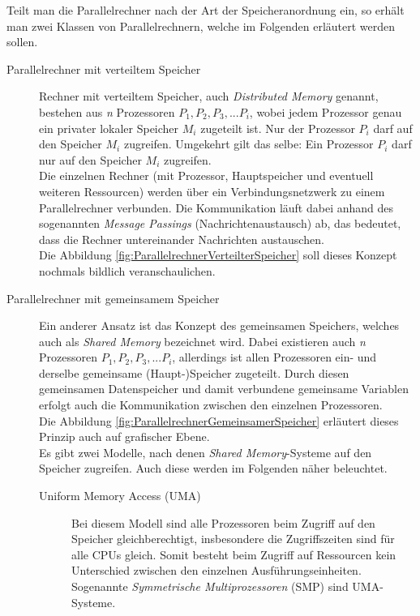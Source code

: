 				Teilt man die Parallelrechner nach der Art der Speicheranordnung ein, so erhält man zwei Klassen von Parallelrechnern, welche im Folgenden erläutert werden sollen.
				
				\begin{description}
					\item [Parallelrechner mit verteiltem Speicher]
						Rechner mit verteiltem Speicher, auch \textit{Distributed Memory} genannt, bestehen aus \textit{n} Prozessoren $P_1, P_2, P_3, ... P_i$, wobei jedem Prozessor genau ein privater lokaler Speicher $M_i$ zugeteilt ist. Nur der Prozessor $P_i$ darf auf den Speicher $M_i$ zugreifen. Umgekehrt gilt das selbe: Ein Prozessor $P_i$ darf nur auf den Speicher $M_i$ zugreifen.\\
						Die einzelnen Rechner (mit Prozessor, Hauptspeicher und eventuell weiteren Ressourcen) werden über ein Verbindungsnetzwerk zu einem Parallelrechner verbunden. Die Kommunikation läuft dabei anhand des sogenannten \textit{Message Passings} (Nachrichtenaustausch) ab, das bedeutet, dass die Rechner untereinander Nachrichten austauschen.\\
						Die Abbildung \ref{fig:ParallelrechnerVerteilterSpeicher} soll dieses Konzept nochmals bildlich veranschaulichen.
						
					\item[Parallelrechner mit gemeinsamem Speicher]
						Ein anderer Ansatz ist das Konzept des gemeinsamen Speichers, welches auch als \textit{Shared Memory} bezeichnet wird. Dabei existieren auch \textit{n} Prozessoren $P_1, P_2, P_3, ... P_i$, allerdings ist allen Prozessoren ein- und derselbe gemeinsame (Haupt-)Speicher zugeteilt. Durch diesen gemeinsamen Datenspeicher und damit verbundene gemeinsame Variablen erfolgt auch die Kommunikation zwischen den einzelnen Prozessoren.\\
						Die Abbildung \ref{fig:ParallelrechnerGemeinsamerSpeicher} erläutert dieses Prinzip auch auf grafischer Ebene.\\
						Es gibt zwei Modelle, nach denen \textit{Shared Memory}-Systeme auf den Speicher zugreifen. Auch diese werden im Folgenden näher beleuchtet. \cite{EntwicklungParallelerProgramme}
						
						\begin{description}
							\item [Uniform Memory Access (UMA)]
								Bei diesem Modell sind alle Prozessoren beim Zugriff auf den Speicher gleichberechtigt, insbesondere die Zugriffszeiten sind für alle CPUs gleich. Somit besteht beim Zugriff auf Ressourcen kein Unterschied zwischen den einzelnen Ausführungseinheiten.\\
								Sogenannte \textit{Symmetrische Multiprozessoren} (SMP) sind UMA-Systeme. \cite{EntwicklungParallelerProgramme}
								

\end{description}
\end{description}

